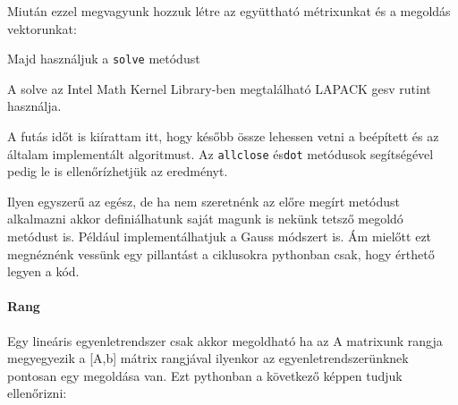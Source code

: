 \begin{python}

\end{python}

    Miután ezzel megvagyunk hozzuk létre az együttható métrixunkat és a
megoldás vektorunkat:

\begin{python}

\end{python}

    Majd használjuk a \texttt{solve} metódust

\begin{python}

\end{python}

\begin{python}

\end{python}

    A solve az Intel Math Kernel Library-ben megtalálható LAPACK gesv rutint
használja.

    A futás időt is kiírattam itt, hogy később össze lehessen vetni a
beépített és az általam implementált algoritmust. Az \texttt{allclose}
és\texttt{dot} metódusok segítségével pedig le is ellenőrízhetjük az
eredményt.

\begin{python}

\end{python}

\begin{python}

\end{python}
        
    Ilyen egyszerű az egész, de ha nem szeretnénk az előre megírt metódust
alkalmazni akkor definiálhatunk saját magunk is nekünk tetsző megoldó
metódust is. Például implementálhatjuk a Gauss módszert is. Ám mielőtt
ezt megnéznénk vessünk egy pillantást a ciklusokra pythonban csak, hogy
érthető legyen a kód.

    \paragraph{Rang}\label{rang}

    Egy lineáris egyenletrendszer csak akkor megoldható ha az A matrixunk
rangja megyegyezik a {[}A,b{]} mátrix rangjával ilyenkor az
egyenletrendszerünknek pontosan egy megoldása van. Ezt pythonban a
következő képpen tudjuk ellenőrizni:


